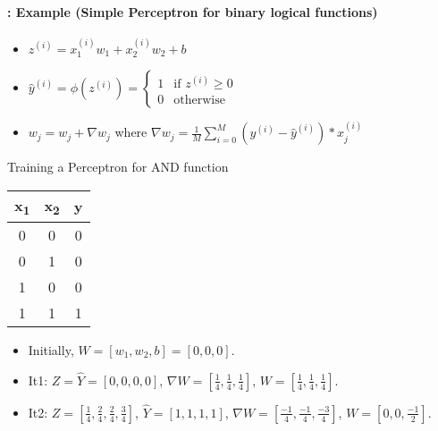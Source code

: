 \documentclass[xcolor=table]{beamer}
\begin{document}
\begin{frame}
	\frametitle{\insertshortsubtitle}
	\framesubtitle{\insertsection: Example (Simple Perceptron for binary logical functions)}
	
	\begin{minipage}{0.30\textwidth} 
	\end{minipage}
	\begin{minipage}{0.59\textwidth}
		\scriptsize
		\begin{itemize}
			\item $ z^{(i)} = x_1^{(i)} w_1 + x_2^{(i)} w_2 + b $
			\item $ \hat{y}^{(i)} = \phi(z^{(i)}) = \begin{cases}
				1 & \text{if } z^{(i)} \ge 0 \\
				0 & \text{otherwise}
			\end{cases} $
			\item $ w_j = w_j + \nabla w_j$ where $ \nabla w_j = \frac{1}{M}\sum_{i=0}^{M} (y^{(i)} - \hat{y}^{(i)}) * x_j^{(i)} $
		\end{itemize}
	\end{minipage}

	\vfill

	\begin{exampleblock}{Training a Perceptron for AND function}
		\begin{minipage}{0.2\textwidth} 
			\scriptsize
			\begin{tabular}{|c|c|c|}
				\hline
				x\textsubscript{1} & x\textsubscript{2} & y \\
				\hline
				0 & 0 & 0  \\
				\hline
				0 & 1 & 0 \\
				\hline
				1 & 0 & 0 \\
				\hline
				1 & 1 & 1 \\
				\hline
			\end{tabular}
		\end{minipage}
		\begin{minipage}{0.79\textwidth}
			\scriptsize
			\begin{itemize}
				\item Initially, $ W = [w_1, w_2, b] = [0, 0, 0] $.
				
				\item It1: $ Z = \hat{Y} = [0, 0, 0, 0] $, 
				$ \nabla W = [\frac{1}{4}, \frac{1}{4}, \frac{1}{4}] $, 
				$ W = [\frac{1}{4}, \frac{1}{4}, \frac{1}{4}] $.
				
				\item It2: $ Z = [\frac{1}{4}, \frac{2}{4}, \frac{2}{4}, \frac{3}{4}] $, 
				$ \hat{Y} = [1, 1, 1, 1] $, 
				$ \nabla W = [\frac{-1}{4}, \frac{-1}{4}, \frac{-3}{4}] $,
				$ W = [0, 0, \frac{-1}{2}] $.
				

\end{itemize}
\end{minipage}
\end{exampleblock}
\end{frame}
\end{document}
